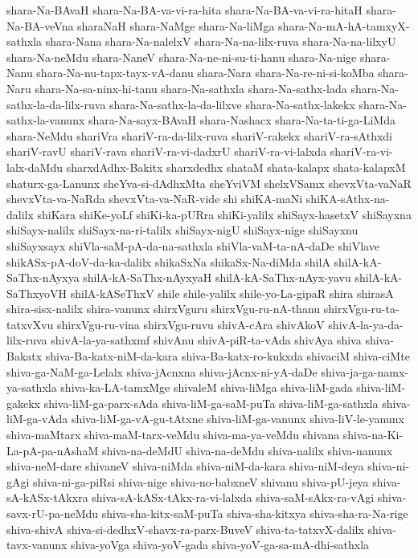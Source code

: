 {shara-Na-BAvaH
shara-Na-BA-va-vi-ra-hita
shara-Na-BA-va-vi-ra-hitaH
shara-Na-BA-veVna
sharaNaH
shara-NaMge
shara-Na-liMga
shara-Na-mA-hA-tamxyX-sathxla
shara-Nana
shara-Na-nalelxV
shara-Na-na-lilx-ruva
shara-Na-na-lilxyU
shara-Na-neMdu
shara-NaneV
shara-Na-ne-ni-su-ti-hanu
shara-Na-nige
shara-Nanu
shara-Na-nu-tapx-tayx-vA-danu
shara-Nara
shara-Na-re-ni-si-koMba
shara-Naru
shara-Na-sa-ninx-hi-tanu
shara-Na-sathxla
shara-Na-sathx-lada
shara-Na-sathx-la-da-lilx-ruva
shara-Na-sathx-la-da-lilxve
shara-Na-sathx-lakekx
shara-Na-sathx-la-vanunx
shara-Na-sayx-BAvaH
shara-Nashacx
shara-Na-ta-ti-ga-LiMda
shara-NeMdu
shariVra
shariV-ra-da-lilx-ruva
shariV-rakekx
shariV-ra-sAthxdi
shariV-ravU
shariV-rava
shariV-ra-vi-dadxrU
shariV-ra-vi-lalxda
shariV-ra-vi-lalx-daMdu
sharxdAdhx-Bakitx
sharxdedhx
shataM
shata-kalapx
shata-kalapxM
shaturx-ga-Lanunx
sheYva-si-dAdhxMta
sheYviVM
shelxVSamx
shevxVta-vaNaR
shevxVta-va-NaRda
shevxVta-va-NaR-vide
shi
shiKA-maNi
shiKA-sAthx-na-dalilx
shiKara
shiKe-yoLf
shiKi-ka-pURra
shiKi-yalilx
shiSayx-hasetxV
shiSayxna
shiSayx-nalilx
shiSayx-na-ri-talilx
shiSayx-nigU
shiSayx-nige
shiSayxnu
shiSayxsayx
shiVla-saM-pA-da-na-sathxla
shiVla-vaM-ta-nA-daDe
shiVlave
shikASx-pA-doV-da-ka-dalilx
shikaSxNa
shikaSx-Na-diMda
shilA
shilA-kA-SaThx-nAyxya
shilA-kA-SaThx-nAyxyaH
shilA-kA-SaThx-nAyx-yavu
shilA-kA-SaThxyoVH
shilA-kASeThxV
shile
shile-yalilx
shile-yo-La-gipaR
shira
shirasA
shira-sisx-nalilx
shira-vanunx
shirxVguru
shirxVgu-ru-nA-thanu
shirxVgu-ru-ta-tatxvXvu
shirxVgu-ru-vina
shirxVgu-ruvu
shivA-cAra
shivAkoV
shivA-la-ya-da-lilx-ruva
shivA-la-ya-sathxmf
shivAnu
shivA-piR-ta-vAda
shivAya
shiva
shiva-Bakatx
shiva-Ba-katx-niM-da-kara
shiva-Ba-katx-ro-kukxda
shivaciM
shiva-ciMte
shiva-ga-NaM-ga-Lelalx
shiva-jAcnxna
shiva-jAcnx-ni-yA-daDe
shiva-ja-ga-namx-ya-sathxla
shiva-ka-LA-tamxMge
shivaleM
shiva-liMga
shiva-liM-gada
shiva-liM-gakekx
shiva-liM-ga-parx-sAda
shiva-liM-ga-saM-puTa
shiva-liM-ga-sathxla
shiva-liM-ga-vAda
shiva-liM-ga-vA-gu-tAtxne
shiva-liM-ga-vanunx
shiva-liV-le-yanunx
shiva-maMtarx
shiva-maM-tarx-veMdu
shiva-ma-ya-veMdu
shivana
shiva-na-Ki-La-pA-pa-nAshaM
shiva-na-deMdU
shiva-na-deMdu
shiva-nalilx
shiva-nanunx
shiva-neM-dare
shivaneV
shiva-niMda
shiva-niM-da-kara
shiva-niM-deya
shiva-ni-gAgi
shiva-ni-ga-piRsi
shiva-nige
shiva-no-babxneV
shivanu
shiva-pU-jeya
shiva-sA-kASx-tAkxra
shiva-sA-kASx-tAkx-ra-vi-lalxda
shiva-saM-sAkx-ra-vAgi
shiva-savx-rU-pa-neMdu
shiva-sha-kitx-saM-puTa
shiva-sha-kitxya
shiva-sha-ra-Na-rige
shiva-shivA
shiva-si-dedhxV-shavx-ra-parx-BuveV
shiva-ta-tatxvX-dalilx
shiva-tavx-vanunx
shiva-yoVga
shiva-yoV-gada
shiva-yoV-ga-sa-mA-dhi-sathxla
}
